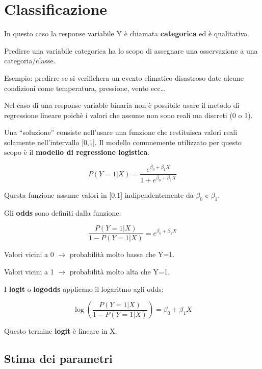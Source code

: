 \section{Classificazione}

In questo caso la response variabile Y è chiamata \textbf{categorica} ed è
qualitativa.

Predirre una variabile categorica ha lo scopo di assegnare una osservazione
a una categoria/classe.

Esempio: predirre se si verifichera un evento climatico disastroso date alcune
condizioni come temperatura, pressione, vento ecc\dots

Nel caso di una response variable binaria non è possibile usare il metodo di
regressione lineare poichè i valori che assume non sono reali ma discreti (0 o
1).

Una ``soluzione'' consiste nell'usare una funzione che restituisca valori reali
solamente nell'intervallo [0,1]. Il modello comunemente utilizzato per questo
scopo è il \textbf{modello di regressione logistica}.

\begin{equation}
P(Y=1|X) = \frac{e^{\beta_0+\beta_1 X}}{1 + e^{\beta_0+\beta_1 X}}
\end{equation}

Questa funzione assume valori in [0,1] indipendentemente da $\beta_0$ e
$\beta_1$.

Gli \textbf{odds} sono definiti dalla funzione:

\begin{equation}
\frac{P(Y=1|X)}{1-P(Y=1|X)} = e^{\beta_0+\beta_1 X}
\end{equation}

Valori vicini a 0 $\rightarrow$ probabilità molto bassa che Y=1.

Valori vicini a 1 $\rightarrow$ probabilità molto alta che Y=1.

I \textbf{logit} o \textbf{logodds} applicano il logaritmo agli odds:

\begin{equation}
\log \left( \frac{P(Y=1|X)}{1-P(Y=1|X)} \right) = \beta_0+\beta_1 X
\end{equation}

Questo termine \textbf{logit} è lineare in X.

\subsection{Stima dei parametri}

